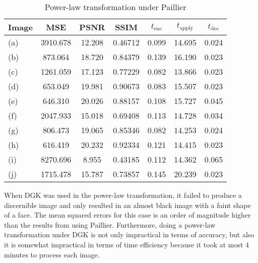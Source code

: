 \begin{table}[t]
	\centering
	\caption{Power-law transformation under Paillier}
	\label{tbl:pwr-pal}
    \begin{tabular}{lcccccc}
        \hline
        Image & MSE  & PSNR & SSIM & $t_\text{enc}$ & $t_\text{apply}$ & $t_\text{dec}$ \\ \hline
        (a) & 3910.678 & 12.208 & 0.46712 & 0.099 & 14.695 & 0.024 \\
		(b) & 873.064 & 18.720 & 0.84379 & 0.139 & 16.190 & 0.023 \\
		(c) & 1261.059 & 17.123 & 0.77229 & 0.082 & 13.866 & 0.023 \\
		(d) & 653.049 & 19.981 & 0.90673 & 0.083 & 15.507 & 0.023 \\
		(e) & 646.310 & 20.026 & 0.88157 & 0.108 & 15.727 & 0.045 \\
		(f) & 2047.933 & 15.018 & 0.69408 & 0.113 & 14.728 & 0.034 \\
		(g) & 806.473 & 19.065 & 0.85346 & 0.082 & 14.253 & 0.024 \\
		(h) & 616.419 & 20.232 & 0.92334 & 0.121 & 14.415 & 0.023 \\
		(i) & 8270.696 & 8.955 & 0.43185 & 0.112 & 14.362 & 0.065 \\
		(j) & 1715.478 & 15.787 & 0.73857 & 0.145 & 20.239 & 0.023 \\
		\hline
        \end{tabular}
\end{table}

When DGK was used in the power-law transformation, it failed to produce a discernible image and only resulted in an almost black image with a faint shape of a face. The mean squared errors for this case is an order of magnitude higher than the results from using Paillier. Furthermore, doing a power-law transformation under DGK is not only impractical in terms of accuracy, but also it is somewhat impractical in terms of time efficiency because it took at most 4 minutes to process each image.

